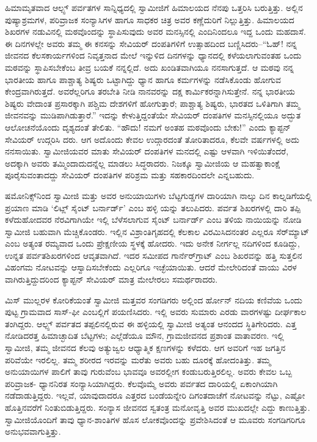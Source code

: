 ಹಿಮಾಮೃತವಾದ ಆಲ್ಪ್ಸ್ ಪರ್ವತಗಳ ಸಾನ್ನಿಧ್ಯದಲ್ಲಿ ಸ್ವಾಮೀಜಿಗೆ ಹಿಮಾಲಯದ ನೆನಪು ಒತ್ತರಿಸಿ ಬರುತ್ತಿತ್ತು. ಅಲ್ಲಿನ ಪುಷ್ಯಾಶ್ರಮಗಳ, ಪರಿವ್ರಾಜಕ ಸಂನ್ಯಾಸಿಗಳ ಹಾಗೂ ಸಾಧಕರ ಚಿತ್ರ ಅವರ ಕಣ್ಣೆದುರಿಗೆ ನಿಲ್ಲುತ್ತಿತ್ತು. ಹಿಮಾಲಯದ ಶಿಖರಗಳ ನಡುವಿನಲ್ಲಿ ಮಠವೊಂದನ್ನು ಸ್ಥಾಪಿಸುವುದು ಅವರ ಮನಸ್ಸಿನಲ್ಲಿ ಎಂದಿನಿಂದಲೂ ಇದ್ದ ಒಂದು ಮಹದಾಸೆ. ಈ ದಿನಗಳಲ್ಲೇ ಅವರು ತಮ್ಮ ಈ ಕನಸನ್ನು ಸೇವಿಯರ್ ದಂಪತಿಗಳಿಗೆ ಉತ್ಸಾಹದಿಂದ ಬಣ್ಣಿಸಿದರು–“ಓಹ್​! ನನ್ನ ಜೀವನದ ಕೆಲಸಕಾರ್ಯಗಳಿಂದ ನಿವೃತ್ತನಾದ ಮೇಲೆ ಇನ್ನುಳಿದ ದಿನಗಳನ್ನು ಧ್ಯಾನದಲ್ಲಿ ಕಳೆಯಲಾಗುವಂತಹ ಒಂದು ಮಠವನ್ನು ಸ್ಥಾಪಿಸಬೇಕೆಂಬ ತೀವ್ರ ಬಯಕೆ ನನ್ನಲ್ಲಿದೆ. ಅದು ಖಂಡಿತವಾಗಿಯೂ ನನಸಾಗುತ್ತದೆ. ಆ ಮಠವು ನನ್ನ ಭಾರತೀಯ ಹಾಗೂ ಪಾಶ್ಚಾತ್ಯ ಶಿಷ್ಯರು ಒಟ್ಟಾಗಿದ್ದು ಧ್ಯಾನ ಹಾಗೂ ಕರ್ಮಗಳನ್ನು ನಡೆಸಿಕೊಂಡು ಹೋಗುವ ಕೇಂದ್ರವಾಗಿರುತ್ತದೆ. ಅವರೆಲ್ಲರಿಗೂ ತರಬೇತಿ ನೀಡಿ ನಾನವರನ್ನು ದಕ್ಷ ಕಾರ್ಮಿಕರನ್ನಾಗಿಸುತ್ತೇನೆ. ನನ್ನ ಭಾರತೀಯ ಶಿಷ್ಯರು ವೇದಾಂತ ಪ್ರಸಾರಕ್ಕಾಗಿ ಪಶ್ಚಿಮ ದೇಶಗಳಿಗೆ ಹೋಗುತ್ತಾರೆ; ಪಾಶ್ಚಾತ್ಯ ಶಿಷ್ಯರು, ಭಾರತದ ಒಳಿತಿಗಾಗಿ ತಮ್ಮ ಜೀವನವನ್ನು ಮುಡಿಪಾಗಿಡುತ್ತಾರೆ.” ಇದನ್ನು ಕೇಳುತ್ತಿದ್ದಂತೆಯೇ ಸೇವಿಯರ್ ದಂಪತಿಗಳ ಮನಸ್ಸಿನಲ್ಲಿಯೂ ಅದ್ಭುತ ಆಲೋಚನೆಯೊಂದು ದೃಶ್ಯದಂತೆ ತೇಲಿತು. “ಹೌದು! ನಮಗೆ ಅಂತಹ ಮಠವೊಂದು ಬೇಕು!” ಎಂದು ಕ್ಯಾಪ್ಟನ್ ಸೇವಿಯರ್ ಉದ್ಗರಿಸಿ ದರು. ಆಗ ಅದೊಂದು ಕೇವಲ ಉದ್ಗಾರದಂತೆ ತೋರಿತಾದರೂ, ಕೆಲವೇ ವರ್ಷಗಳಲ್ಲಿ ಅದು ನನಸಾಯಿತು. ಸ್ವಾಮೀಜಿಯವರ ಮಾತು ಸೇವಿಯರ್ ದಂಪತಿಗಳ ಮನದಲ್ಲಿ ಎಷ್ಟು ಆಳವಾಗಿ ಇಳಿಯಿತೆಂದರೆ, ಅದಕ್ಕಾಗಿ ಅವರು ತಮ್ಮಿಂದಾದುದನ್ನೆಲ್ಲ ಮಾಡಲು ಸಿದ್ಧರಾದರು. ನಿಜಕ್ಕೂ ಸ್ವಾಮೀಜಿಯ ಆ ಮಹತ್ವಾಕಾಂಕ್ಷೆ ಪೂರೈಸುವಂತಾದದ್ದು ಸೇವಿಯರ್ ದಂಪತಿಗಳ ಪರಿಶ್ರಮ ಮತ್ತು ಸಹಕಾರದಿಂದಲೇ ಎನ್ನಬಹುದು.

ಷಮೋನಿಕ್ಸ್​ನಿಂದ ಸ್ವಾಮೀಜಿ ಮತ್ತು ಅವರ ಅನುಯಾಯಿಗಳು ಬೆಟ್ಟಗುಡ್ಡಗಳ ದಾರಿಯಾಗಿ ನಾಲ್ಕು ದಿನ ಕಾಲ್ನಡಿಗೆಯಲ್ಲಿ ಪ್ರಯಾಣ ಮಾಡಿ ‘ಲಿಟ್ಲ್ ಸೈಂಟ್ ಬರ್ನಾರ್ಡ್​’ ಎಂಬ ಹಳ್ಳಿ ಯನ್ನು ತಲುಪಿದರು. ಪರ್ವತ ಶಿಖರಗಳಲ್ಲಿ ದಾರಿ ತಪ್ಪಿ ಕಳೆದುಹೋದವರ ನೆರವಿಗಾಗಿಯೇ ಇಲ್ಲಿ ಬೆಳೆಸಲಾಗುವ ಸೈಂಟ್ ಬರ್ನಾರ್ಡ್ ಎಂಬ ತಳಿಯ ನಾಯಿಯನ್ನು ನೋಡಿ ಸ್ವಾಮೀಜಿ ಬಹುವಾಗಿ ಮೆಚ್ಚಿಕೊಂಡರು. ಇಲ್ಲಿನ ವಿಶ್ರಾಂತಿಗೃಹದಲ್ಲಿ ಕೆಲಕಾಲ ವಿರಮಿಸಿದನಂತರ ಎಲ್ಲರೂ ಸೆರ್​ಮ್ಯಾಟ್ ಎಂಬ ಅತ್ಯಂತ ರಮ್ಯವಾದ ಒಂದು ಪ್ರೇಕ್ಷಣೀಯ ಸ್ಥಳಕ್ಕೆ ಹೋದರು. ಇದು ಅನೇಕ ನೀರ್ಗಲ್ಲ ನದಿಗಳಿಂದ ಕೂಡಿದ್ದು, ಉನ್ನತ ಪರ್ವತಶಿಖರಗಳಿಂದ ಆವೃತವಾಗಿದೆ. ಇದರ ಸಮೀಪದ ಗಾರ್ನೆರ್​ಗ್ರಾಟ್ ಎಂಬ ಶಿಖರವನ್ನು ಹತ್ತಿ ಸುತ್ತಲಿನ ವಿಹಂಗಮ ನೋಟವನ್ನು ಆಸ್ವಾದಿಸಬೇಕೆಂದು ಎಲ್ಲರಿಗೂ ಇಚ್ಛೆಯಾಯಿತು. ಆದರೆ ಮೇಲೇರಿದಂತೆ ವಾಯು ವಿರಳ ವಾಗಿರುತ್ತಿದ್ದುದರಿಂದ ಕ್ಯಾಪ್ಟನ್ ಸೇವಿಯರ್ ಮಾತ್ರ ಮೇಲೇರಲು ಸಮರ್ಥರಾದರು.

ಮಿಸ್ ಮುಲ್ಲರಳ ಕೋರಿಕೆಯಂತೆ ಸ್ವಾಮೀಜಿ ಮತ್ತವರ ಸಂಗಡಿಗರು ಅಲ್ಲಿಂದ ರ್ಹೋನ್ ನದಿಯ ಕಣಿವೆಯ ಒಂದು ಪುಟ್ಟ ಗ್ರಾಮವಾದ ಸಾಸ್​-ಫೀ ಎಂಬಲ್ಲಿಗೆ ಪಯಣಿಸಿದರು. ಇಲ್ಲಿ ಅವರು ಸುಮಾರು ಎರಡು ವಾರಗಳಷ್ಟು ದೀರ್ಘಕಾಲ ತಂಗಿದ್ದರು. ಆಲ್ಪ್ಸ್ ಪರ್ವತದ ತಪ್ಪಲಿನಲ್ಲಿರುವ ಈ ಹಳ್ಳಿಯಲ್ಲಿ ಸ್ವಾಮೀಜಿ ಅತ್ಯಂತ ಆನಂದದ ಸ್ಥಿತಿಗೇರಿದರು. ಎತ್ತ ನೋಡಿದರತ್ತ ಹಿಮಾಚ್ಛಾದಿತ ಬೆಟ್ಟಗಳು; ಎಲ್ಲೆಡೆಯೂ ಮೌನ, ಗ್ರಾಮಜೀವನದ ಪ್ರಶಾಂತ ವಾತಾವರಣ. ಇಲ್ಲಿ ಸ್ವಾಮೀಜಿ, ತಮ್ಮ ಜೀವನದ ಕೆಲವು ಅತ್ಯುಜ್ವಲ ಆಧ್ಯಾತ್ಮಿಕ ಕ್ಷಣಗಳನ್ನು ಕಳೆದರು. ಆಗ ಅವರಿಗೆ ಇಹ ಜಗತ್ತಿನ ಪರಿವೆಯೇ ಇರಲಿಲ್ಲ. ತಮ್ಮ ಶರೀರದ ಇರವನ್ನು ಮರೆತು ಅವರು ಬಹು ದೂರಕ್ಕೆ ಹೋದಂತಿತ್ತು. ತಮ್ಮ ಅನುಯಾಯಿಗಳ ಪಾಲಿಗೆ ತಾವು ಗುರುವೆಂಬ ಭಾವವೂ ಅವರಲ್ಲೀಗ ಕಂಡುಬರುತ್ತಿರಲಿಲ್ಲ. ಅವರು ಕೇವಲ ಒಬ್ಬ ಪರಿವ್ರಾಜಕ- ಧ್ಯಾನನಿರತ ಸಂನ್ಯಾಸಿಯಾಗಿದ್ದರು. ಕೆಲವೊಮ್ಮೆ ಅವರು ಪರ್ವತದ ದಾರಿಯಲ್ಲಿ ಏಕಾಂಗಿಯಾಗಿ ನಡೆದಾಡುತ್ತಿದ್ದರು. ಇಲ್ಲವೆ, ಯಾವುದಾದರೂ ಎತ್ತರದ ಬಂಡೆಯನ್ನೇರಿ ದಿಗಂತದಾಚೆಗೆ ನೋಟವನ್ನು ನೆಟ್ಟು, ಎಷ್ಟೋ ಹೊತ್ತಿನವರೆಗೆ ನಿಂತುಬಿಡುತ್ತಿದ್ದರು. ಸಂನ್ಯಾಸ ಜೀವನದ ಸ್ವತಂತ್ರ ಮನೋವೃತ್ತಿ ಅವರ ಮುಖದಲ್ಲೇ ಎದ್ದು ಕಾಣುತ್ತಿತ್ತು. ಸ್ವಾಮೀಜಿಯೊಂದಿಗೆ ತಾವು ಧ್ಯಾನ-ಶಾಂತಿಗಳ ಹೊಸ ಲೋಕವೊಂದನ್ನು ಪ್ರವೇಶಿಸಿದಂತೆ ಆ ಮೂವರು ಸಂಗಡಿಗರಿಗೂ ಅನುಭವವಾಗುತ್ತಿತ್ತು.

